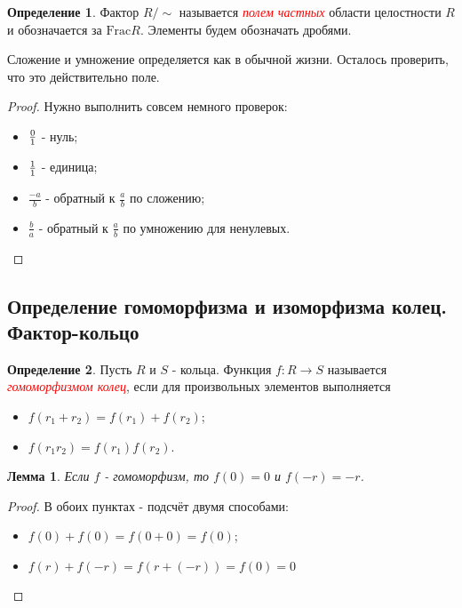 \documentclass[a4paper,100pt]{article}
\theoremstyle{indented}
\newtheorem{lemma}{Лемма}
\theoremstyle{definition}
\newtheorem{defn}{Определение}
\theoremstyle{remark}
\begin{document}
\begin{defn}
    Фактор $R/{\sim}$ называется \hypertarget{n18}{\textcolor{red}{\textit{полем частных}}} области целостности $R$ и обозначается за $\text{Frac}R$. Элементы будем обозначать дробями.
\end{defn}

Сложение и умножение определяется как в обычной жизни. Осталось проверить, что это действительно поле.

\begin{proof} Нужно выполнить совсем немного проверок: \
    \begin{itemize}
        \item $0\over 1$ - нуль;
        \item $1\over 1$ - единица;
        \item $\frac{-a}{b}$ - обратный к $\frac{a}{b}$ по сложению;
        \item $\frac{b}{a}$ - обратный к $\frac{a}{b}$ по умножению для ненулевых.
    \end{itemize}
\end{proof}

\resetall

\subsection{Определение гомоморфизма и изоморфизма колец. Фактор-кольцо}

\begin{defn}
    Пусть $R$ и $S$ - кольца. Функция $f:R\rightarrow S$ называется \hypertarget{n19}{\textcolor{red}{\textit{гомоморфизмом колец}}}, если для произвольных элементов выполняется
    \begin{itemize}
        \item $f(r_1+r_2)=f(r_1)+f(r_2)$;
        \item $f(r_1r_2)=f(r_1)f(r_2)$.
    \end{itemize}
\end{defn}

\begin{lemma}
    Если $f$ - гомоморфизм, то $f(0)=0$ и $f(-r)=-r$.
\end{lemma}

\begin{proof}
    В обоих пунктах - подсчёт двумя способами:\ 

    \begin{itemize}
        \item $f(0)+f(0)=f(0+0)=f(0)$;
        \item $f(r)+f(-r)=f(r+(-r))=f(0)=0$
    \end{itemize}
\end{proof}
\end{document}
